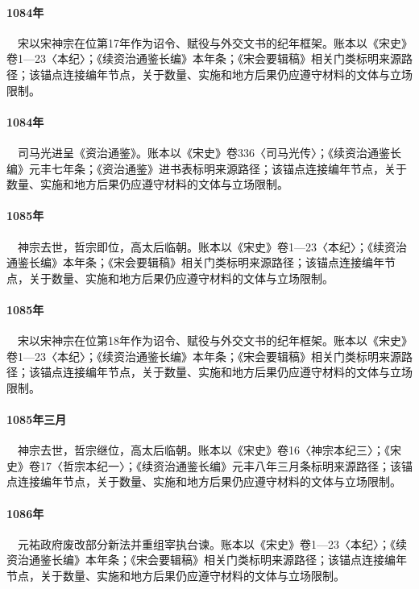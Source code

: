 \paragraph{1084年}　宋以宋神宗在位第17年作为诏令、赋役与外交文书的纪年框架。账本以《宋史》卷1—23〈本纪〉；《续资治通鉴长编》本年条；《宋会要辑稿》相关门类标明来源路径；该锚点连接编年节点，关于数量、实施和地方后果仍应遵守材料的文体与立场限制。

\paragraph{1084年}　司马光进呈《资治通鉴》。账本以《宋史》卷336〈司马光传〉；《续资治通鉴长编》元丰七年条；《资治通鉴》进书表标明来源路径；该锚点连接编年节点，关于数量、实施和地方后果仍应遵守材料的文体与立场限制。

\paragraph{1085年}　神宗去世，哲宗即位，高太后临朝。账本以《宋史》卷1—23〈本纪〉；《续资治通鉴长编》本年条；《宋会要辑稿》相关门类标明来源路径；该锚点连接编年节点，关于数量、实施和地方后果仍应遵守材料的文体与立场限制。

\paragraph{1085年}　宋以宋神宗在位第18年作为诏令、赋役与外交文书的纪年框架。账本以《宋史》卷1—23〈本纪〉；《续资治通鉴长编》本年条；《宋会要辑稿》相关门类标明来源路径；该锚点连接编年节点，关于数量、实施和地方后果仍应遵守材料的文体与立场限制。

\paragraph{1085年三月}　神宗去世，哲宗继位，高太后临朝。账本以《宋史》卷16〈神宗本纪三〉；《宋史》卷17〈哲宗本纪一〉；《续资治通鉴长编》元丰八年三月条标明来源路径；该锚点连接编年节点，关于数量、实施和地方后果仍应遵守材料的文体与立场限制。

\paragraph{1086年}　元祐政府废改部分新法并重组宰执台谏。账本以《宋史》卷1—23〈本纪〉；《续资治通鉴长编》本年条；《宋会要辑稿》相关门类标明来源路径；该锚点连接编年节点，关于数量、实施和地方后果仍应遵守材料的文体与立场限制。


